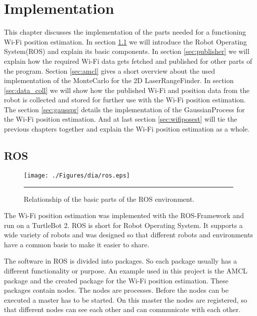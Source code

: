 \chapter{Implementation} %
\label{Chapter3}
This chapter discusses the implementation of the parts needed for a functioning Wi-Fi position estimation. In section \ref{sec:ros} we will introduce the Robot Operating System(ROS) and explain its basic components.
In section \ref{sec:publisher} we will explain how the required Wi-Fi data gets fetched and published for other parts of the program.
Section \ref{sec:amcl} gives a short overview about the used implementation of the \Gls{MonteCarlo} for the 2D \gls{LaserRangeFinder}.
In section \ref{sec:data_coll} we will show how the published Wi-Fi and position data from the robot is collected and stored for further use with the Wi-Fi position estimation.
The section \ref{sec:gausspr} details the implementation of the \Gls{GaussianProcess} for the Wi-Fi position estimation.
And at last section \ref{sec:wifiposest} will tie the previous chapters together and explain the Wi-Fi position estimation as a whole.

\section{ROS}\label{sec:ros}
\begin{figure}[htbp]
	\centering
		\texttt{[image: ./Figures/dia/ros.eps]}
		\rule{35em}{0.5pt}
	\caption[Diagram of basic concepts in ROS]{Relationship of the basic parts of the ROS environment.}
	\label{fig:ros_architecture}
\end{figure}
The Wi-Fi position estimation was implemented with the ROS-Framework and run on a TurtleBot 2. ROS\citep{Fernandez:2015:LRR:2876174} is short for Robot Operating System. It supports a wide variety of robots and was designed so that different robots and environments have a common basis to make it easier to share. 

The software in ROS is divided into packages. So each package usually has a different functionality or purpose. An example used in this project is the AMCL package and the created package for the Wi-Fi position estimation. These packages contain nodes. The nodes are processes. Before the nodes can be executed a master has to be started. On this master the nodes are registered, so that different nodes can see each other and can communicate with each other. 

